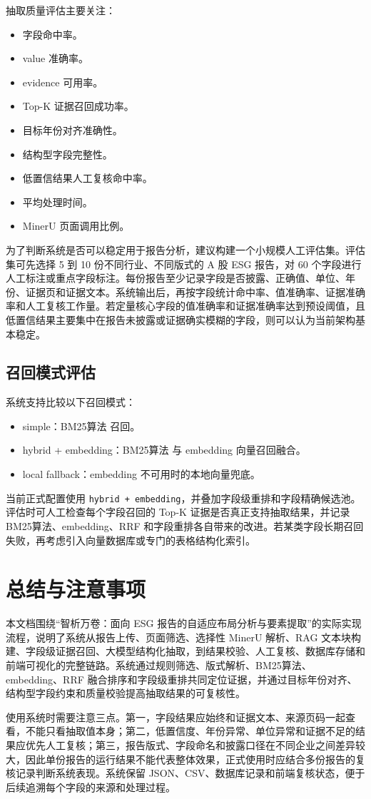 \documentclass[UTF8,a4paper,12pt]{ctexart}
\begin{document}
抽取质量评估主要关注：

\begin{itemize}
  \item 字段命中率。
  \item value 准确率。
  \item evidence 可用率。
  \item Top-K 证据召回成功率。
  \item 目标年份对齐准确性。
  \item 结构型字段完整性。
  \item 低置信结果人工复核命中率。
  \item 平均处理时间。
  \item MinerU 页面调用比例。
\end{itemize}

为了判断系统是否可以稳定用于报告分析，建议构建一个小规模人工评估集。评估集可先选择 5 到 10 份不同行业、不同版式的 A 股 ESG 报告，对 60 个字段进行人工标注或重点字段标注。每份报告至少记录字段是否披露、正确值、单位、年份、证据页和证据文本。系统输出后，再按字段统计命中率、值准确率、证据准确率和人工复核工作量。若定量核心字段的值准确率和证据准确率达到预设阈值，且低置信结果主要集中在报告未披露或证据确实模糊的字段，则可以认为当前架构基本稳定。

\subsection{召回模式评估}

系统支持比较以下召回模式：

\begin{itemize}
  \item simple：BM25算法 召回。
  \item hybrid + embedding：BM25算法 与 embedding 向量召回融合。
  \item local fallback：embedding 不可用时的本地向量兜底。
\end{itemize}

当前正式配置使用 \texttt{hybrid + embedding}，并叠加字段级重排和字段精确候选池。评估时可人工检查每个字段召回的 Top-K 证据是否真正支持抽取结果，并记录 BM25算法、embedding、RRF 和字段重排各自带来的改进。若某类字段长期召回失败，再考虑引入向量数据库或专门的表格结构化索引。

\section{总结与注意事项}

本文档围绕“智析万卷：面向 ESG 报告的自适应布局分析与要素提取”的实际实现流程，说明了系统从报告上传、页面筛选、选择性 MinerU 解析、RAG 文本块构建、字段级证据召回、大模型结构化抽取，到结果校验、人工复核、数据库存储和前端可视化的完整链路。系统通过规则筛选、版式解析、BM25算法、embedding、RRF 融合排序和字段级重排共同定位证据，并通过目标年份对齐、结构型字段约束和质量校验提高抽取结果的可复核性。

使用系统时需要注意三点。第一，字段结果应始终和证据文本、来源页码一起查看，不能只看抽取值本身；第二，低置信度、年份异常、单位异常和证据不足的结果应优先人工复核；第三，报告版式、字段命名和披露口径在不同企业之间差异较大，因此单份报告的运行结果不能代表整体效果，正式使用时应结合多份报告的复核记录判断系统表现。系统保留 JSON、CSV、数据库记录和前端复核状态，便于后续追溯每个字段的来源和处理过程。
\end{document}
